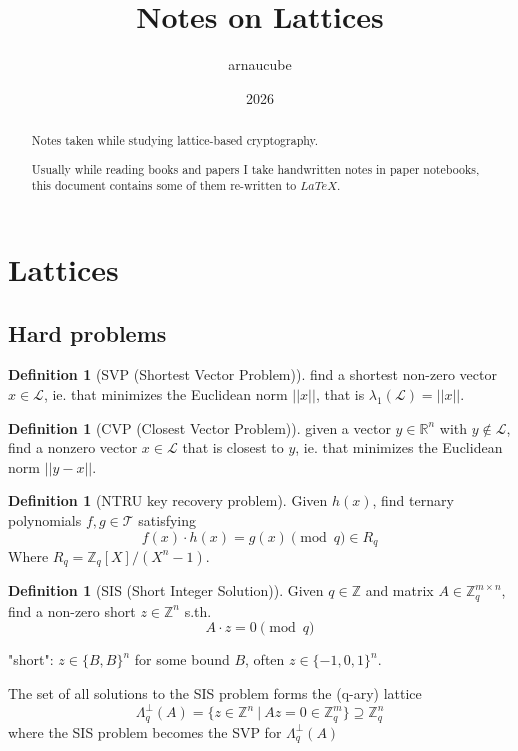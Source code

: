 \documentclass{article}
\title{Notes on Lattices}
\author{arnaucube}
\date{2026}
\theoremstyle{definition}
\newtheorem{defn}[thm]{Definition}
\newcommand{\Rr}{\mathbb{R}}
\newcommand{\Zz}{\mathbb{Z}}
\newcommand{\Ll}{\mathcal{L}}
\begin{document}
\maketitle

\begin{abstract}
    Notes taken while studying lattice-based cryptography.

    Usually while reading books and papers I take handwritten notes in paper notebooks, this document contains some of them re-written to $LaTeX$.
\end{abstract}

\tableofcontents

\section{Lattices}
\subsection{Hard problems}

\begin{defn}[SVP (Shortest Vector Problem)]
find a shortest non-zero vector $x \in \Ll$, ie. that minimizes the Euclidean norm $||x||$, that is $\lambda_1(\Ll)=||x||$.
\end{defn}

\begin{defn}[CVP (Closest Vector Problem)]
given a vector $y \in \Rr^n$ with $y \not\in \Ll$, find a nonzero vector $x \in \Ll$ that is closest to $y$, ie. that minimizes the Euclidean norm $||y-x||$.
\end{defn}

\begin{defn}[NTRU key recovery problem]
Given $h(x)$, find ternary polynomials $f, g \in \mathcal{T}$ satisfying
$$f(x) \cdot h(x) = g(x) \pmod q \in R_q$$
Where $R_q = \Zz_q[X]/(X^n-1)$.
\end{defn}

\begin{defn}[SIS (Short Integer Solution)]
Given $q \in \Zz$ and matrix $A \in \Zz_q^{m \times n}$, find a non-zero short $z \in \Zz^n$ s.th.
$$A \cdot z = 0 \pmod q$$

\small{"short": $z \in \{B, B\}^n$ for some bound $B$, often $z \in \{-1, 0, 1 \}^n$.}
\end{defn}

The set of all solutions to the SIS problem forms the (q-ary) lattice
$$\Lambda^{\perp}_q(A) = \{ z \in \Zz^n ~|~ A z = 0 \in \Zz_q^m \} \supseteq \Zz_q^n$$
where the SIS problem becomes the SVP for $\Lambda_q^{\perp}(A)$
\end{document}
